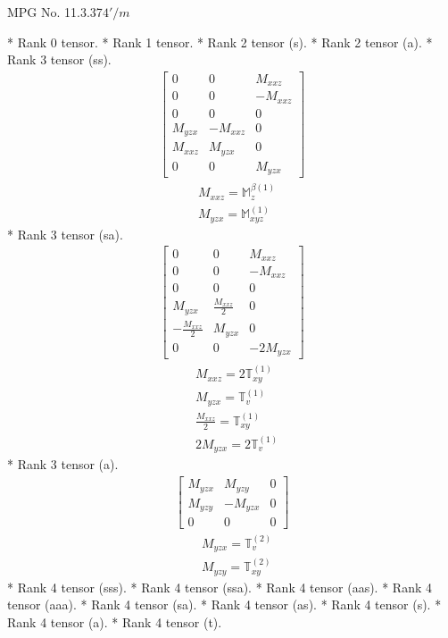 \documentclass[fleqn,8pt,landscape]{jsarticle}
\begin{document}
\setcounter{MaxMatrixCols}{32}

\renewcommand{\tablename}{Table~}
\renewcommand{\figurename}{Figure~}
\begin{center}
\LARGE
MPG No. 11.3.37\quad$4'/m$
\end{center}
* Rank 0 tensor.
* Rank 1 tensor.
* Rank 2 tensor (s).
* Rank 2 tensor (a).
* Rank 3 tensor (ss).
\begin{align*}
\begin{bmatrix} 0 & 0 & M_{xxz} \\ 0 & 0 & - M_{xxz} \\ 0 & 0 & 0 \\ M_{yzx} & - M_{xxz} & 0 \\ M_{xxz} & M_{yzx} & 0 \\ 0 & 0 & M_{yzx} \end{bmatrix}
\end{align*}
\begin{align*}
& M_{xxz} = \mathbb{M}_{z}^{\beta(1)} \\
& M_{yzx} = \mathbb{M}_{xyz}^{(1)}
\end{align*}
* Rank 3 tensor (sa).
\begin{align*}
\begin{bmatrix} 0 & 0 & M_{xxz} \\ 0 & 0 & - M_{xxz} \\ 0 & 0 & 0 \\ M_{yzx} & \frac{M_{xxz}}{2} & 0 \\ - \frac{M_{xxz}}{2} & M_{yzx} & 0 \\ 0 & 0 & - 2 M_{yzx} \end{bmatrix}
\end{align*}
\begin{align*}
& M_{xxz} = 2 \mathbb{T}_{xy}^{(1)} \\
& M_{yzx} = \mathbb{T}_{v}^{(1)} \\
& \frac{M_{xxz}}{2} = \mathbb{T}_{xy}^{(1)} \\
& 2 M_{yzx} = 2 \mathbb{T}_{v}^{(1)}
\end{align*}
* Rank 3 tensor (a).
\begin{align*}
\begin{bmatrix} M_{yzx} & M_{yzy} & 0 \\ M_{yzy} & - M_{yzx} & 0 \\ 0 & 0 & 0 \end{bmatrix}
\end{align*}
\begin{align*}
& M_{yzx} = \mathbb{T}_{v}^{(2)} \\
& M_{yzy} = \mathbb{T}_{xy}^{(2)}
\end{align*}
* Rank 4 tensor (sss).
* Rank 4 tensor (ssa).
* Rank 4 tensor (aas).
* Rank 4 tensor (aaa).
* Rank 4 tensor (sa).
* Rank 4 tensor (as).
* Rank 4 tensor (s).
* Rank 4 tensor (a).
* Rank 4 tensor (t).
\end{document}
